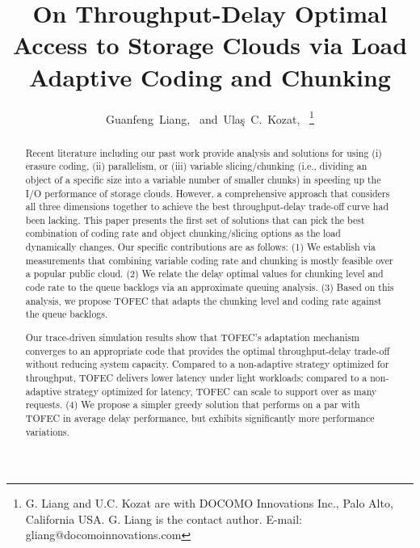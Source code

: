 \documentclass[journal]{IEEEtran}
\newcommand{\comment}[1]{}
\newcommand{\ourscheme}{TOFEC\xspace}
\begin{document}
\title{On Throughput-Delay Optimal Access to Storage Clouds via Load Adaptive Coding and Chunking}

\author{Guanfeng~Liang,~
        and~Ula\c{s}~C.~Kozat,~
\thanks{G. Liang and U.C. Kozat are with DOCOMO Innovations Inc., Palo Alto, California USA. G. Liang is the contact author. E-mail: gliang@docomoinnovations.com}
}
\maketitle

\begin{abstract}
Recent literature including our past work provide analysis and solutions for using (i) erasure coding, (ii) parallelism, or (iii) variable slicing/chunking (i.e., dividing an object of a specific size into a variable number of smaller chunks) in speeding up the I/O performance of storage clouds.  However, a comprehensive approach that considers all three dimensions together to achieve the best throughput-delay trade-off curve had been lacking.  This paper presents the first set of solutions that can pick the best combination of coding rate and object chunking/slicing options as the load dynamically changes. Our specific contributions are as follows: (1) We establish via measurements that combining variable coding rate and chunking is mostly feasible over a popular public cloud. (2) We relate the delay optimal values for chunking level and code rate to the queue backlogs via an approximate queuing analysis. (3) Based on this analysis, we propose \ourscheme that adapts the chunking level and coding rate against the queue backlogs. 
\comment{Under light workloads, \ourscheme creates  smaller chunks and uses more parallel connections per file, minimizing service delay. Under heavy workloads, \ourscheme automatically reduces the level of chunking (fewer chunks with increased size) and uses fewer parallel connections to reduce overhead, resulting in higher throughput and preventing queueing delay.} 
Our trace-driven simulation results show that \ourscheme's adaptation mechanism converges to an appropriate code that provides the optimal throughput-delay trade-off without reducing system capacity. Compared to a non-adaptive strategy optimized for throughput, \ourscheme delivers  lower latency under light workloads; compared to a non-adaptive strategy optimized for latency, \ourscheme can scale to support over  as many requests. (4) We propose a simpler greedy solution that \comment{does not require the modeling of the delay distribution. The greedy solution} 
performs on a par with \ourscheme in average delay performance, but exhibits significantly more performance variations.   
\comment{
}


\end{abstract}
\end{document}
